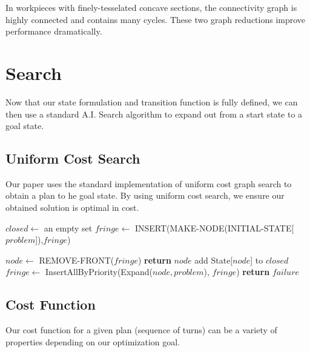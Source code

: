In workpieces with finely-tesselated concave sections, the connectivity graph is highly connected and contains many cycles. These two graph reductions improve performance dramatically.


\section{Search}

Now that our state formulation and transition function is fully defined, we can then use a standard A.I. Search algorithm to expand out from a start state to a goal state.

	\subsection{Uniform Cost Search}

Our paper uses the standard implementation of uniform cost graph search to obtain a plan to he goal state. By using uniform cost search, we ensure our obtained solution is optimal in cost.

\begin{algorithm}[H]
\begin{algorithmic}[1]
	\State $closed \gets$ an empty set
	\State $fringe \gets$ INSERT(MAKE-NODE(INITIAL-STATE[$problem$]),$fringe$)

		\State $node \gets$ REMOVE-FRONT($fringe$)
			\State \textbf{return} $node$ 
		\EndIf
			\State add State[$node$] to $closed$
			\State $fringe \gets$ InsertAllByPriority(Expand($node, problem$), $fringe$)
		\EndIf
	\EndWhile
	\State \textbf{return} $failure$ 

\EndFunction

\end{algorithmic}
\end{algorithm}

	\subsection{Cost Function}

Our cost function for a given plan (sequence of turns) can be a variety of properties depending on our optimization goal.

